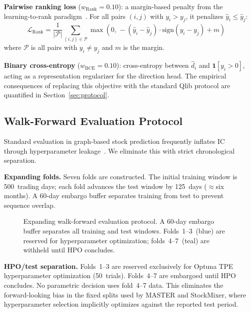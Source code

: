 \documentclass[journal]{IEEEtran}
\begin{document}
\textbf{Pairwise ranking loss} ($w_{\mathrm{Rank}}=0.10$): a
margin-based penalty from the learning-to-rank
paradigm~\cite{burges2005learning}. For all pairs $(i,j)$ with
$y_i>y_j$, it penalizes $\hat{y}_i\le\hat{y}_j$:
\begin{equation}
  \mathcal{L}_{\mathrm{Rank}} = \frac{1}{|\mathcal{P}|}
    \sum_{(i,j)\in\mathcal{P}}
    \max\!\left(0,\,-(\hat{y}_i-\hat{y}_j)
    \cdot\mathrm{sign}(y_i-y_j)+m\right)
  \label{eq:loss_rank}
\end{equation}
where $\mathcal{P}$ is all pairs with $y_i\ne y_j$ and $m$ is the
margin.

\textbf{Binary cross-entropy} ($w_{\mathrm{BCE}}=0.10$): cross-entropy
between $\hat{d}_i$ and $\mathbf{1}[y_i>0]$, acting as a representation
regularizer for the direction head. The empirical consequences of
replacing this objective with the standard Qlib protocol are quantified
in Section~\ref{sec:protocol}.

\subsection{Walk-Forward Evaluation Protocol}

Standard evaluation in graph-based stock prediction frequently inflates
IC through hyperparameter leakage~\cite{lopezdeprado2018advances}. We
eliminate this with strict chronological separation.

\textbf{Expanding folds.} Seven folds are constructed. The initial
training window is 500~trading days; each fold advances the test window
by 125~days ($\approx$six months). A 60-day embargo buffer separates
training from test to prevent sequence overlap.

\begin{figure}[!t]
\centering
\resizebox{\columnwidth}{!}{}
\caption{Expanding walk-forward evaluation protocol. A 60-day embargo
buffer separates all training and test windows. Folds~1--3~(blue) are
reserved for hyperparameter optimization; folds~4--7~(teal) are
withheld until HPO concludes.}
\label{fig:walkforward}
\end{figure}

\textbf{HPO/test separation.} Folds~1--3 are reserved exclusively for
Optuna TPE hyperparameter optimization (50~trials). Folds~4--7 are
embargoed until HPO concludes. No parametric decision uses fold~4--7
data. This eliminates the forward-looking bias in the fixed splits used
by MASTER and StockMixer, where hyperparameter selection implicitly
optimizes against the reported test period.
\end{document}
